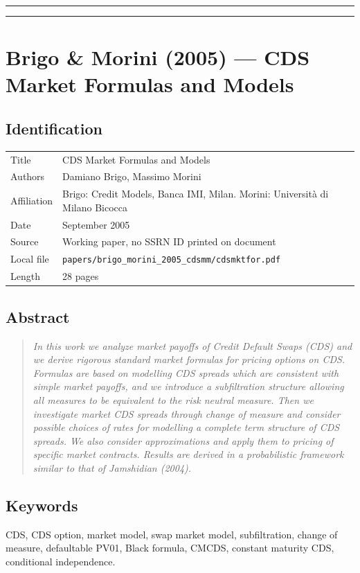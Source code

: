 \documentclass[11pt,a4paper]{article}
\begin{document}
\bigskip\hrule\bigskip

\bigskip\hrule\bigskip

\section{Brigo \& Morini (2005) --- CDS Market Formulas and Models}
\label{bib:brigo-morini-2005}

\subsection*{Identification}
\begin{tabular}{@{}p{3.5cm}p{11cm}@{}}
\toprule
Title           & CDS Market Formulas and Models \\
Authors         & Damiano Brigo, Massimo Morini \\
Affiliation     & Brigo: Credit Models, Banca IMI, Milan. Morini: Università di Milano Bicocca \\
Date            & September 2005 \\
Source          & Working paper, no SSRN ID printed on document \\
Local file      & \texttt{papers/brigo\_morini\_2005\_cdsmm/cdsmktfor.pdf} \\
Length          & 28 pages \\
\bottomrule
\end{tabular}

\subsection*{Abstract}
\begin{quote}\itshape
In this work we analyze market payoffs of Credit Default Swaps (CDS)
and we derive rigorous standard market formulas for pricing options
on CDS. Formulas are based on modelling CDS spreads which are
consistent with simple market payoffs, and we introduce a
subfiltration structure allowing all measures to be equivalent to
the risk neutral measure. Then we investigate market CDS spreads
through change of measure and consider possible choices of rates for
modelling a complete term structure of CDS spreads. We also consider
approximations and apply them to pricing of specific market
contracts. Results are derived in a probabilistic framework similar
to that of Jamshidian (2004).
\end{quote}

\subsection*{Keywords}
CDS, CDS option, market model, swap market model, subfiltration,
change of measure, defaultable PV01, Black formula, CMCDS,
constant maturity CDS, conditional independence.
\end{document}

